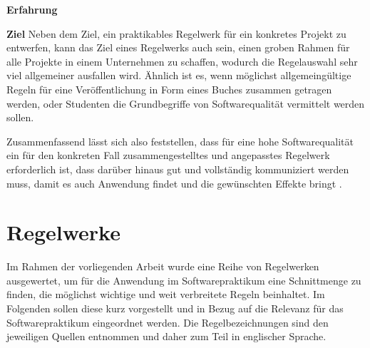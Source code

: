 \documentclass[da,ngerman]{stthesis}
\begin{document}
\begin{labeling}{\textbf{Erfahrung}}
				  \item [\textbf{Ziel}] Neben dem Ziel, ein praktikables Regelwerk für ein konkretes Projekt zu entwerfen, kann das Ziel eines Regelwerks auch sein, einen groben Rahmen für alle Projekte in einem Unternehmen zu schaffen, wodurch die Regelauswahl sehr viel allgemeiner ausfallen wird. Ähnlich ist es, wenn möglichst allgemeingültige Regeln für eine Veröffentlichung in Form eines Buches zusammen getragen werden, oder Studenten die Grundbegriffe von Softwarequalität vermittelt werden sollen.
			\end{labeling}
			Zusammenfassend lässt sich also feststellen, dass für eine hohe Softwarequalität ein für den konkreten Fall zusammengestelltes und angepasstes Regelwerk erforderlich ist, dass darüber hinaus gut und vollständig kommuniziert werden muss, damit es auch Anwendung findet und die gewünschten Effekte bringt \cite{ImproveCodeQuality}.
		\section{Regelwerke}
			Im Rahmen der vorliegenden Arbeit wurde eine Reihe von Regelwerken ausgewertet, um für die Anwendung im Softwarepraktikum eine Schnittmenge zu finden, die möglichst wichtige und weit verbreitete Regeln beinhaltet. Im Folgenden sollen diese kurz vorgestellt und in Bezug auf die Relevanz für das Softwarepraktikum eingeordnet werden. Die Regelbezeichnungen sind den jeweiligen Quellen entnommen und daher zum Teil in englischer Sprache.
\end{document}
